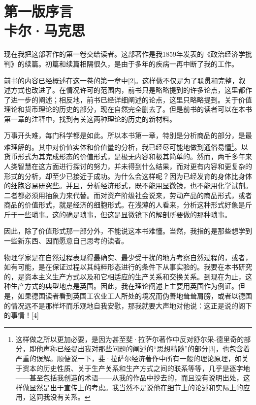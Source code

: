 \documentclass{ctexbook}
\begin{document}
\thispagestyle{empty}
\clearpage

\frontmatter

\chapter[卡尔·马克思\hspace{1em}第一版序言]{第一版序言\\{\small 卡尔·马克思}}

现在我把这部著作的第一卷交给读者。这部著作是我1859年发表的《政治经济学批判》的续篇。初篇和续篇相隔很久，是由于多年的疾病一再中断了我的工作。

前书的内容已经概述在这一卷的第一章中[2]。这样做不仅是为了联贯和完整，叙述方式也改进了。在情况许可的范围内，前书只是略略提到的许多论点，这里都作了进一步的阐述；相反地，前书已经详细阐述的论点，这里只略略提到。关于价值理论和货币理论的历史的部分，现在自然完全删去了。但是前书的读者可以在本书第一章的注释中，找到有关这两种理论的历史的新材料。

万事开头难，每门科学都是如此。所以本书第一章，特别是分析商品的部分，是最难理解的。其中对价值实体和价值量的分析，我已经尽可能地做到通俗易懂\footnote{这样做之所以更加必要，是因为甚至斐·拉萨尔著作中反对舒尔采-德里奇的部分，即他声称已经提出我对那些问题的阐述的“思想精髓”的部分[3]，也包含着严重的误解。顺便说一下，斐·拉萨尔经济著作中所有一般的理论原理，如关于资本的历史性质、关于生产关系和生产方式之间的联系等等，几乎是逐字地——甚至包括我创造的术语——从我的作品中抄去的，而且没有说明出处，这样做显然是出于宣传上的考虑。我当然不是说他在细节上的论述和实际上的应用，这同我没有关系。}。以货币形式为其完成形态的价值形式，是极无内容和极其简单的。然而，两千多年来人类智慧在这方面进行探讨的努力，并未得到什么结果，而对更有内容和更复杂的形式的分析，却至少已接近于成功。为什么会这样呢？因为已经发育的身体比身体的细胞容易研究些。并且，分析经济形式，既不能用显微镜，也不能用化学试剂。二者都必须用抽象力来代替。而对资产阶级社会说来，劳动产品的商品形式，或者商品的价值形式，就是经济的细胞形式。在浅薄的人看来，分析这种形式好象是斤斤于一些琐事。这的确是琐事，但这是显微镜下的解剖所要做的那种琐事。

因此，除了价值形式那一部分外，不能说这本书难懂。当然，我指的是那些想学到一些新东西、因而愿意自己思考的读者。

物理学家是在自然过程表现得最确实、最少受干扰的地方考察自然过程的，或者，如有可能，是在保证过程以其纯粹形态进行的条件下从事实验的。我要在本书研究的，是资本主义生产方式以及和它相适应的生产关系和交换关系。到现在为止，这种生产方式的典型地点是英国。因此，我在理论阐述上主要用英国作为例证。但是，如果德国读者看到英国工农业工人所处的境况而伪善地耸耸肩膀，或者以德国的情况远不是那样坏而乐观地自我安慰，那我就要大声地对他说：这正是说的阁下的事情！[4]
\end{document}
